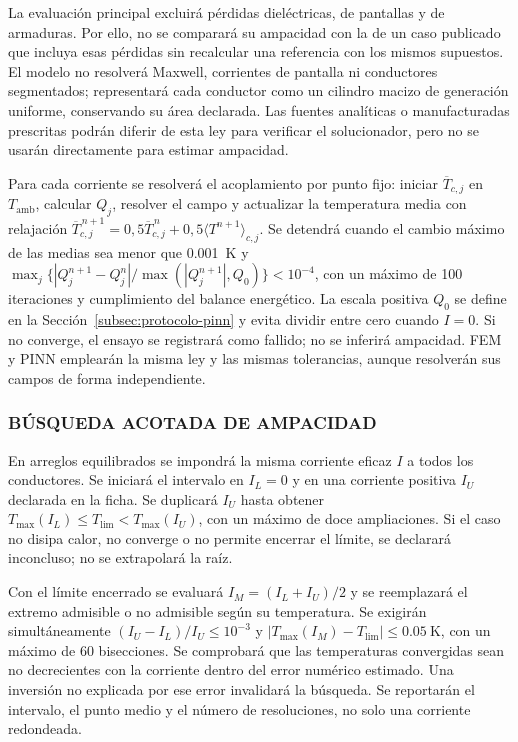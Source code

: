 La evaluación principal excluirá pérdidas dieléctricas, de pantallas y de armaduras. Por ello, no se comparará su ampacidad con la de un caso publicado que incluya esas pérdidas sin recalcular una referencia con los mismos supuestos. El modelo no resolverá Maxwell, corrientes de pantalla ni conductores segmentados; representará cada conductor como un cilindro macizo de generación uniforme, conservando su área declarada. Las fuentes analíticas o manufacturadas prescritas podrán diferir de esta ley para verificar el solucionador, pero no se usarán directamente para estimar ampacidad.

Para cada corriente se resolverá el acoplamiento por punto fijo: iniciar $\overline{T}_{c,j}$ en $T_{\mathrm{amb}}$, calcular $Q_j$, resolver el campo y actualizar la temperatura media con relajación $\overline{T}_{c,j}^{\,n+1}=0{,}5\overline{T}_{c,j}^{\,n}+0{,}5\langle T^{n+1}\rangle_{c,j}$. Se detendrá cuando el cambio máximo de las medias sea menor que \SI{0.001}{\kelvin} y $\max_j\bigl\{|Q_j^{n+1}-Q_j^n|/\max(|Q_j^{n+1}|,Q_0)\bigr\}<10^{-4}$, con un máximo de 100 iteraciones y cumplimiento del balance energético. La escala positiva $Q_0$ se define en la Sección~\ref{subsec:protocolo-pinn} y evita dividir entre cero cuando $I=0$. Si no converge, el ensayo se registrará como fallido; no se inferirá ampacidad. FEM y PINN emplearán la misma ley y las mismas tolerancias, aunque resolverán sus campos de forma independiente.

\subsubsection{BÚSQUEDA ACOTADA DE AMPACIDAD}
\label{subsec:busqueda-ampacidad}
En arreglos equilibrados se impondrá la misma corriente eficaz $I$ a todos los conductores. Se iniciará el intervalo en $I_L=0$ y en una corriente positiva $I_U$ declarada en la ficha. Se duplicará $I_U$ hasta obtener $T_{\max}(I_L)\leq T_{\mathrm{lim}}<T_{\max}(I_U)$, con un máximo de doce ampliaciones. Si el caso no disipa calor, no converge o no permite encerrar el límite, se declarará inconcluso; no se extrapolará la raíz.

Con el límite encerrado se evaluará $I_M=(I_L+I_U)/2$ y se reemplazará el extremo admisible o no admisible según su temperatura. Se exigirán simultáneamente $(I_U-I_L)/I_U\leq10^{-3}$ y $|T_{\max}(I_M)-T_{\mathrm{lim}}|\leq\SI{0.05}{\kelvin}$, con un máximo de 60 bisecciones. Se comprobará que las temperaturas convergidas sean no decrecientes con la corriente dentro del error numérico estimado. Una inversión no explicada por ese error invalidará la búsqueda. Se reportarán el intervalo, el punto medio y el número de resoluciones, no solo una corriente redondeada.

